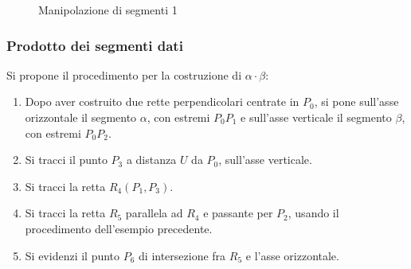 \begin{figure}%
\begin{center}%
\hspace{.20in}%
\end{center}%
\caption{Manipolazione di segmenti 1}%
\end{figure}


\subsubsection{Prodotto dei segmenti dati}
Si propone il procedimento per la costruzione di $\alpha \cdot \beta$:

\begin{enumerate}

\item Dopo aver costruito due rette perpendicolari centrate in $P_{0}$, si pone sull'asse orizzontale il segmento $\alpha$, con estremi $P_{0} P_{1}$ e sull'asse verticale il segmento $\beta$, con estremi $P_{0} P_{2}$.

\item Si tracci il punto $P_{3}$ a distanza $U$ da $P_{0}$, sull'asse verticale.

\item Si tracci la retta $R_{4}(P_{1}, P_{3})$.

\item Si tracci la retta $R_{5}$ parallela ad $R_{4}$ e passante per $P_{2}$, usando il procedimento dell'esempio precedente.

\item Si evidenzi il punto $P_{6}$ di intersezione fra $R_{5}$ e l'asse orizzontale. 

\end{enumerate}

